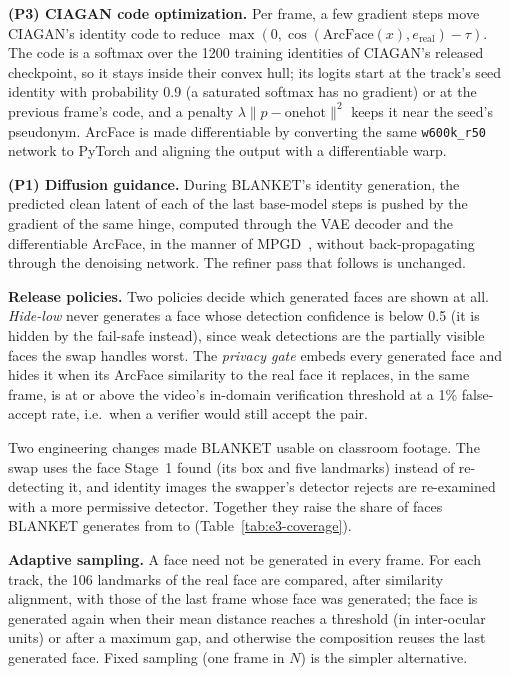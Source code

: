\textbf{(P3) CIAGAN code optimization.} Per frame, a few gradient steps move
CIAGAN's identity code to reduce
$\max(0, \cos(\mathrm{ArcFace}(x), e_{\mathrm{real}}) - \tau)$. The code is a
softmax over the 1200 training identities of CIAGAN's released checkpoint, so it stays inside their convex
hull; its logits start at the track's seed identity with probability 0.9 (a
saturated softmax has no gradient) or at the previous frame's code, and a
penalty $\lambda\lVert p - \mathrm{onehot}\rVert^2$ keeps it near the seed's
pseudonym. ArcFace is made differentiable by converting the same
\texttt{w600k\_r50} network to PyTorch and aligning the output with a
differentiable warp.

\textbf{(P1) Diffusion guidance.} During BLANKET's identity generation, the
predicted clean latent of each of the last base-model steps is pushed by the
gradient of the same hinge, computed through the VAE decoder and the
differentiable ArcFace, in the manner of MPGD~\cite{mpgd}, without
back-propagating through the denoising network. The refiner pass that follows
is unchanged.

\textbf{Release policies.} Two policies decide which generated faces are shown at
all. \emph{Hide-low} never generates a face whose detection confidence is below
0.5 (it is hidden by the fail-safe instead), since weak detections are the
partially visible faces the swap handles worst. The \emph{privacy gate} embeds
every generated face and hides it when its ArcFace similarity to the real face it
replaces, in the same frame, is at or above the video's in-domain verification
threshold at a 1\% false-accept rate, i.e.\ when a verifier would still accept
the pair.

Two engineering changes made BLANKET usable on classroom footage. The swap uses
the face Stage~1 found (its box and five landmarks) instead of re-detecting it,
and identity images the swapper's detector rejects are re-examined with a
more permissive detector. Together they raise the share of faces BLANKET
generates from  to
 (Table~\ref{tab:e3-coverage}).

\textbf{Adaptive sampling.} A face need not be generated in every frame. For each
track, the 106 landmarks of the real face are compared, after similarity
alignment, with those of the last frame whose face was generated; the face is
generated again when their mean distance reaches a threshold (in inter-ocular
units) or after a maximum gap, and otherwise the composition reuses the last
generated face. Fixed sampling (one frame in $N$) is the simpler alternative.

